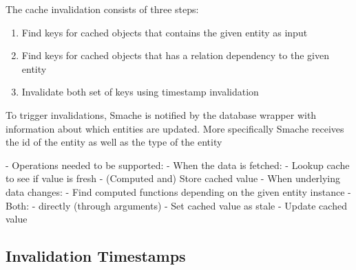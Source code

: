 The cache invalidation consists of three steps:

\begin{enumerate}
  \item Find keys for cached objects that contains the given entity as input
  \item Find keys for cached objects that has a relation dependency to the given entity
  \item Invalidate both set of keys using timestamp invalidation
\end{enumerate}

To trigger invalidations, Smache is notified by the database wrapper with information about which entities are updated. More specifically Smache receives the id of the entity as well as the type of the entity~







- Operations needed to be supported:
  - When the data is fetched:
    - Lookup cache to see if value is fresh
    - (Computed and) Store cached value
  - When underlying data changes:
    - Find computed functions depending on the given entity instance
      - Both:
        - directly (through arguments)
    - Set cached value as stale
    - Update cached value


\subsection{Invalidation Timestamps}
\label{subsec:invalidation-timestamps}


